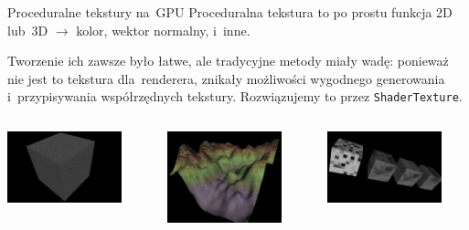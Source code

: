\documentclass{beamer}
\begin{document}
\begin{frame}[fragile]{Proceduralne tekstury na~GPU}
Proceduralna tekstura to po prostu funkcja 2D lub~3D $\rightarrow$
kolor, wektor normalny, i~inne.

\vspace{0.1in}

Tworzenie ich zawsze było łatwe, ale tradycyjne metody miały wadę:
ponieważ nie jest to tekstura dla~renderera, znikały możliwości wygodnego
generowania i~przypisywania współrzędnych tekstury. Rozwiązujemy to przez
\texttt{ShaderTexture}.

\begin{center}
\begin{columns}[T]
  \begin{column}{1in}
    \includegraphics[width=1.3in]{../shader_texture_edge_detection}
  \end{column}
  \begin{column}{1in}
    \includegraphics[width=1.3in]{../terrain}
  \end{column}
  \begin{column}{1in}
    \includegraphics[width=1.3in]{../noise}
  \end{column}
\end{columns}
\end{center}

\end{frame}
\end{document}
